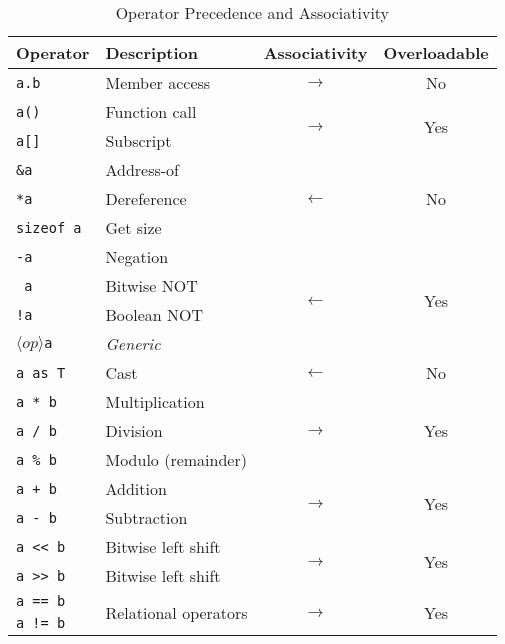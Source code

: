 \begin{table}[h]
    \centering
    \caption{Operator Precedence and Associativity}
    \begin{tabular}{|l|l|c|c|}
        \hline
        \textbf{Operator} & \textbf{Description} & \textbf{Associativity} & \textbf{Overloadable} \\
        \hline
        \texttt{a.b} & Member access & \(\longrightarrow\) & No \\
        \hline
        \texttt{a()} & Function call & \multirow{2}{*}{\(\longrightarrow\)} & \multirow{2}{*}{Yes} \\
        \texttt{a[]} & Subscript & & \\
        \hline
        \texttt{\&a} & Address-of & \multirow{3}{*}{\(\longleftarrow\)} & \multirow{3}{*}{No} \\
        \texttt{*a} & Dereference & & \\
        \texttt{sizeof a} & Get size & & \\
        \hline
        \texttt{-a} & Negation & \multirow{4}{*}{\(\longleftarrow\)} & \multirow{4}{*}{Yes} \\
        \texttt{~a} & Bitwise NOT & & \\
        \texttt{!a} & Boolean NOT & & \\
        \(\langle op \rangle\)\texttt{a} & \textit{Generic} & & \\
        \hline
        \texttt{a as T} & Cast & \(\longleftarrow\) & No \\
        \hline
        \texttt{a * b} & Multiplication & \multirow{3}{*}{\(\longrightarrow\)} & \multirow{3}{*}{Yes} \\
        \texttt{a / b} & Division & & \\
        \texttt{a \% b} & Modulo (remainder) & & \\
        \hline
        \texttt{a + b} & Addition & \multirow{2}{*}{\(\longrightarrow\)} & \multirow{2}{*}{Yes} \\
        \texttt{a - b} & Subtraction & & \\
        \hline
        \texttt{a << b} & Bitwise left shift & \multirow{2}{*}{\(\longrightarrow\)} & \multirow{2}{*}{Yes} \\
        \texttt{a >> b} & Bitwise left shift & & \\
        \hline
        \texttt{a == b} & \multirow{6}{*}{Relational operators} & \multirow{6}{*}{\(\longrightarrow\)} & \multirow{6}{*}{Yes} \\
        \texttt{a != b} & & & \\

\end{tabular}
\end{table}
